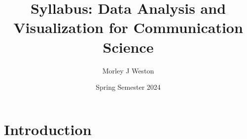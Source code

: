\documentclass{article}
\title{Syllabus: Data Analysis and Visualization for Communication Science}
\author{Morley J Weston}
\date{Spring Semester 2024}
\begin{document}
\maketitle

\section{Introduction}
\end{document}

